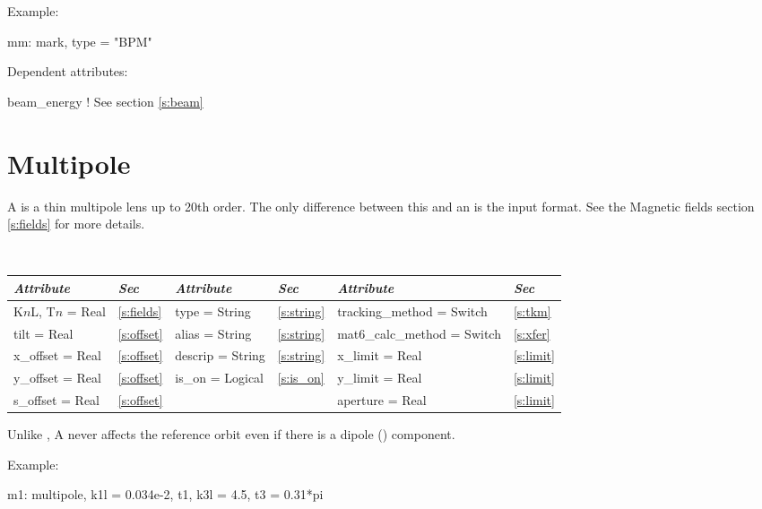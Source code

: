 \vskip0.05in \noindent
Example:
\begin{example}
  mm: mark, type = "BPM"
\end{example}

\vskip0.05in \noindent
Dependent attributes:
\begin{example}
  beam\_energy  ! See section \ref{s:beam}
\end{example}

\section{Multipole}
\label{s:mult}

A  is a thin multipole lens up to 20th order. The only
difference between this and an  is the input format. See the 
Magnetic fields section \ref{s:fields} for more details.

\toffset
\begin{center}
\tt
\begin{tabular}{|l|l||l|l||l|l|} \hline
  {\sl Attribute} & {\sl Sec}  & {\sl Attribute} & {\sl Sec} & {\sl Attribute} & {\sl Sec} \\ \hline
  K$n$L, T$n$ = Real &  \ref{s:fields} &  type = String                & \ref{s:string} & tracking\_method = Switch   & \ref{s:tkm}   \\ \hline
  tilt       = Real  &  \ref{s:offset} &  alias = String               & \ref{s:string} & mat6\_calc\_method = Switch & \ref{s:xfer}  \\ \hline
  x\_offset  = Real  &  \ref{s:offset} &  descrip = String             & \ref{s:string} & x\_limit = Real             & \ref{s:limit} \\ \hline
  y\_offset  = Real  &  \ref{s:offset} &  is\_on = Logical             & \ref{s:is_on}  & y\_limit = Real             & \ref{s:limit} \\ \hline
  s\_offset  = Real  &  \ref{s:offset} &                               &                & aperture = Real             & \ref{s:limit} \\ \hline
\end{tabular}
\end{center}
\toffset

Unlike \mad, A  never affects the reference orbit
even if there is a dipole () component.

\vskip0.05in \noindent
Example:
\begin{example}
  m1: multipole, k1l = 0.034e-2, t1, k3l = 4.5, t3 = 0.31*pi
\end{example}

